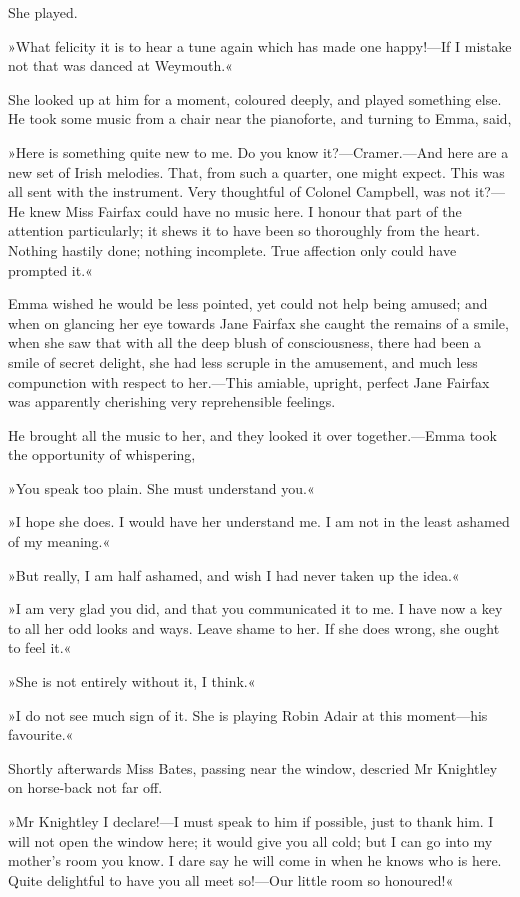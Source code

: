 She played.

»What felicity it is to hear a tune again which has made one happy!—If I mistake not that was danced at Weymouth.«

She looked up at him for a moment, coloured deeply, and played something else. He took some music from a chair near the pianoforte, and turning to Emma, said,

»Here is something quite new to me. Do you know it?—Cramer.—And here are a new set of Irish melodies. That, from such a quarter, one might expect. This was all sent with the instrument. Very thoughtful of Colonel Campbell, was not it?—He knew Miss Fairfax could have no music here. I honour that part of the attention particularly; it shews it to have been so thoroughly from the heart. Nothing hastily done; nothing incomplete. True affection only could have prompted it.«

Emma wished he would be less pointed, yet could not help being amused; and when on glancing her eye towards Jane Fairfax she caught the remains of a smile, when she saw that with all the deep blush of consciousness, there had been a smile of secret delight, she had less scruple in the amusement, and much less compunction with respect to her.—This amiable, upright, perfect Jane Fairfax was apparently cherishing very reprehensible feelings.

He brought all the music to her, and they looked it over together.—Emma took the opportunity of whispering,

»You speak too plain. She must understand you.«

»I hope she does. I would have her understand me. I am not in the least ashamed of my meaning.«

»But really, I am half ashamed, and wish I had never taken up the idea.«

»I am very glad you did, and that you communicated it to me. I have now a key to all her odd looks and ways. Leave shame to her. If she does wrong, she ought to feel it.«

»She is not entirely without it, I think.«

»I do not see much sign of it. She is playing Robin Adair at this moment—his favourite.«

Shortly afterwards Miss Bates, passing near the window, descried Mr Knightley on horse-back not far off.

»Mr Knightley I declare!—I must speak to him if possible, just to thank him. I will not open the window here; it would give you all cold; but I can go into my mother's room you know. I dare say he will come in when he knows who is here. Quite delightful to have you all meet so!—Our little room so honoured!«

